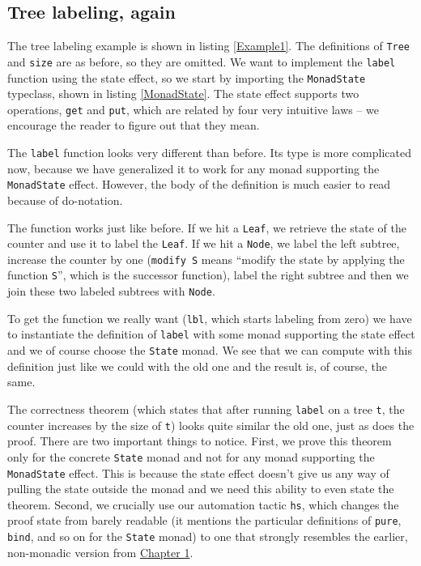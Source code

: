 \documentclass[declaration,inz,english,shortabstract]{iithesis}
\newcommand{\m}[1]{\texttt{#1}}
\begin{document}
\subsection{Tree labeling, again}

The tree labeling example is shown in listing \ref{Example1}. The definitions of \m{Tree} and \m{size} are as before, so they are omitted. We want to implement the \m{label} function using the state effect, so we start by importing the \m{MonadState} typeclass, shown in listing \ref{MonadState}. The state effect supports two operations, \m{get} and \m{put}, which are related by four very intuitive laws -- we encourage the reader to figure out that they mean.

The \m{label} function looks very different than before. Its type is more complicated now, because we have generalized it to work for any monad supporting the \m{MonadState} effect. However, the body of the definition is much easier to read because of do-notation. 

The function works just like before. If we hit a \m{Leaf}, we retrieve the state of the counter and use it to label the \m{Leaf}. If we hit a \m{Node}, we label the left subtree, increase the counter by one (\m{modify S} means ``modify the state by applying the function \m{S}'', which is the successor function), label the right subtree and then we join these two labeled subtrees with \m{Node}.

To get the function we really want (\m{lbl}, which starts labeling from zero) we have to instantiate the definition of \m{label} with some monad supporting the state effect and we of course choose the \m{State} monad. We see that we can compute with this definition just like we could with the old one and the result is, of course, the same.

The correctness theorem (which states that after running \m{label} on a tree \m{t}, the counter increases by the size of \m{t}) looks quite similar the old one, just as does the proof. There are two important things to notice. First, we prove this theorem only for the concrete \m{State} monad and not for any monad supporting the \m{MonadState} effect. This is because the state effect doesn't give us any way of pulling the state outside the monad and we need this ability to even state the theorem. Second, we crucially use our automation tactic \m{hs}, which changes the proof state from barely readable (it mentions the particular definitions of \m{pure}, \m{bind}, and so on for the \m{State} monad) to one that strongly resembles the earlier, non-monadic version from \hyperref[ch1]{Chapter 1}.
\end{document}
